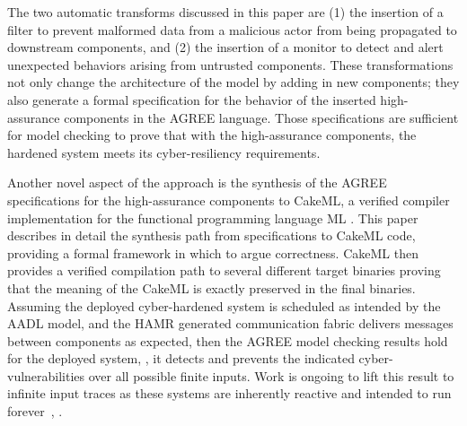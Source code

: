 
The two automatic transforms discussed in this paper are (1) the insertion of a filter to prevent malformed data from a malicious actor from being propagated to downstream components, and (2) the insertion of a monitor to detect and alert unexpected behaviors arising from untrusted components. These transformations not only change the architecture of the model by adding in new components; they also generate a formal specification for the behavior of the inserted high-assurance components in the AGREE language. Those specifications are sufficient for model checking to prove that with the high-assurance components, the hardened system meets its cyber-resiliency requirements.

Another novel aspect of the approach is the synthesis of the AGREE specifications for the high-assurance components to CakeML, a verified compiler implementation for the functional programming language ML \cite{cakeml}. This paper describes in detail the synthesis path from specifications to CakeML code, providing a formal framework in which to argue correctness. CakeML then provides a verified compilation path to several different target binaries proving that the meaning of the CakeML is exactly preserved in the final binaries. Assuming the deployed cyber-hardened system is scheduled as intended by the AADL model, and the HAMR generated communication fabric delivers messages between components as expected, then the AGREE model checking results hold for the deployed system, \ie, it detects and prevents the indicated cyber-vulnerabilities over all possible finite inputs. Work is ongoing to lift this result to infinite input traces as these systems are inherently reactive and intended to run forever~\cite{case-verified-filter}, \cite{cakeml-space-cost}.

